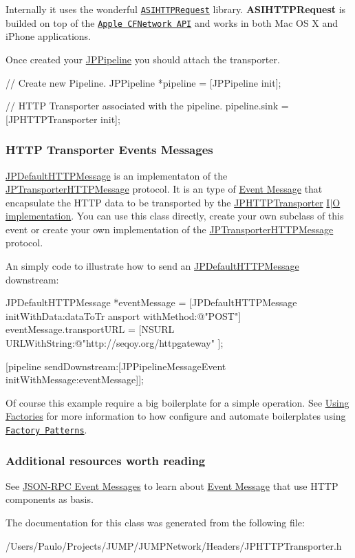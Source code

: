 Internally it uses the wonderful \href{http://allseeing-i.com/ASIHTTPRequest/}{\tt ASIHTTPRequest} library. {\bfseries ASIHTTPRequest} is builded on top of the \href{http://developer.apple.com/library/mac/#documentation/Networking/Conceptual/CFNetwork/Introduction/Introduction.html}{\tt Apple CFNetwork API} and works in both Mac OS X and iPhone applications. 

Once created your \hyperlink{a00019}{JPPipeline} you should attach the transporter. 
\begin{DoxyCode}
 // Create new Pipeline.
 JPPipeline *pipeline = [JPPipeline init];
 
 // HTTP Transporter associated with the pipeline.
 pipeline.sink = [JPHTTPTransporter init];
\end{DoxyCode}
 \subsubsection*{HTTP Transporter Events Messages}

\hyperlink{a00012}{JPDefaultHTTPMessage} is an implementaton of the \hyperlink{a00040}{JPTransporterHTTPMessage} protocol. It is an type of \hyperlink{a00006}{Event Message} that encapsulate the HTTP data to be transported by the \hyperlink{a00014}{JPHTTPTransporter} \hyperlink{a00002}{I$|$O implementation}. You can use this class directly, create your own subclass of this event or create your own implementation of the \hyperlink{a00040}{JPTransporterHTTPMessage} protocol. 

An simply code to illustrate how to send an \hyperlink{a00012}{JPDefaultHTTPMessage} downstream: 
\begin{DoxyCode}
 JPDefaultHTTPMessage *eventMessage = [JPDefaultHTTPMessage initWithData:dataToTr
      ansport withMethod:@"POST"]
 eventMessage.transportURL = [NSURL URLWithString:@"http://seqoy.org/httpgateway"
      ];
 
 [pipeline sendDownstream:[JPPipelineMessageEvent initWithMessage:eventMessage]];
      
\end{DoxyCode}
 Of course this example require a big boilerplate for a simple operation. See \hyperlink{a00004}{Using Factories} for more information to how configure and automate boilerplates using \href{http://en.wikipedia.org/wiki/Factory_method_pattern}{\tt Factory Patterns}.

\subsubsection*{Additional resources worth reading}

See \hyperlink{a00008}{JSON-\/RPC Event Messages} to learn about \hyperlink{a00006}{Event Message} that use HTTP components as basis.

\par
 \par
  

The documentation for this class was generated from the following file:\begin{DoxyCompactItemize}
\item 
/Users/Paulo/Projects/JUMP/JUMPNetwork/Headers/JPHTTPTransporter.h\end{DoxyCompactItemize}
